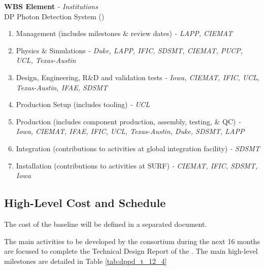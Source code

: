 \textbf{WBS Element} \textit{- Institutions} \\
DP Photon Detection  System (\dual {})
\begin{enumerate}
\item Management \dual {} (includes milestones \& review dates) \textit{- LAPP, CIEMAT }
\item Physics \& Simulations \textit{- Duke, LAPP, IFIC, SDSMT, CIEMAT, PUCP, UCL, Texas-Austin}
\item Design, Engineering, R\&D and validation tests \textit{- Iowa, CIEMAT, IFIC, UCL, Texas-Austin, IFAE, SDSMT}
\item Production Setup (includes tooling) \textit{- UCL}
\item Production (includes component production, assembly, testing, \& QC) \textit{- Iowa, CIEMAT, IFAE, IFIC, UCL, Texas-Austin, Duke, SDSMT, LAPP}
\item Integration (contributions to activities at global integration facility) \textit{- SDSMT}
\item Installation (contributions to activities at SURF) \textit{- CIEMAT, IFIC, SDSMT, Iowa}
\end{enumerate}


\subsection{High-Level Cost and Schedule}
\label{sec:fddp-pd-12.4}

The cost of the baseline \dual  {} will be defined in a separated document.

The main activities to be developed by the \dual {} consortium during the next 16 months are focused to complete the Technical Design Report of the \dual {}. The main high-level milestones are detailed in Table \ref{tab:dppd_t_12_4}

